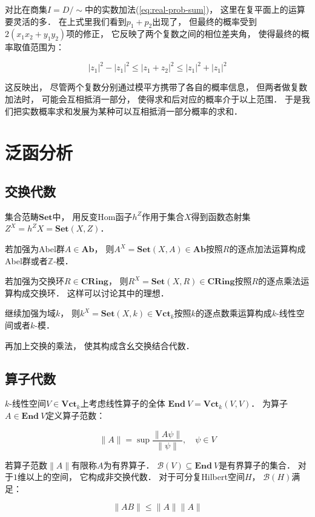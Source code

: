 \documentclass[10pt, openany]{book}
\begin{document}
对比在商集$I = D/\sim$中的实数加法(\ref{eq:real-prob-sum})，
这里在复平面上的运算要灵活的多．
在上式里我们看到$p_1 + p_2$出现了，
但最终的概率受到$2(x_1x_2 + y_1y_2)$项的修正，
它反映了两个复数之间的相位差夹角，
使得最终的概率取值范围为：

$$
|z_1|^2 - |z_1|^2 \leq |z_1 + z_2|^2 \leq |z_1|^2 + |z_1|^2
$$

这反映出，
尽管两个复数分别通过模平方携带了各自的概率信息，
但两者做复数加法时，
可能会互相抵消一部分，
使得求和后对应的概率介于以上范围．
于是我们把实数概率求和发展为某种可以互相抵消一部分概率的求和．

\chapter{泛函分析}


\section{交换代数}

集合范畴$\textbf{Set}$中，
用反变Hom函子$h^Z$作用于集合$X$得到函数态射集
$Z^X = h^Z X = \textbf{Set}(X,Z)$．

若加强为Abel群$A\in\textbf{Ab}$，
则$A^X = \textbf{Set}(X,A)\in\textbf{Ab}$按照$R$的逐点加法运算构成Abel群或者$\mathbb Z$-模．

若加强为交换环$R\in\textbf{CRing}$，
则$R^X = \textbf{Set}(X,R)\in\textbf{CRing}$按照$R$的逐点乘法运算构成交换环．
这样可以讨论其中的理想．

继续加强为域$k$，
则$k^X = \textbf{Set}(X,k)\in\textbf{Vct}_k$按照$k$的逐点数乘运算构成$k$-线性空间或者$k$-模．

再加上交换的乘法，
使其构成含幺交换结合代数．

\section{算子代数}

$k$-线性空间$V\in\textbf{Vct}_k$上考虑线性算子的全体
$\textbf{End} \ V = \textbf{Vct}_k(V,V)$．
为算子$A\in\textbf{End} \ V$定义算子范数：

$$
\| A \| = \sup \frac{\| A\psi \|}{\| \psi \|},\quad 
\psi \in V
$$

若算子范数$\| A \|$有限称$A$为有界算子．
$\mathcal B(V) \subseteq \textbf{End} \ V$是有界算子的集合．
对于$1$维以上的空间，
它构成非交换代数．
对于可分复Hilbert空间$H$，
$\mathcal B(H)$满足：

$$
\| A B \| \leq \| A \| \| A \|
$$
\end{document}
